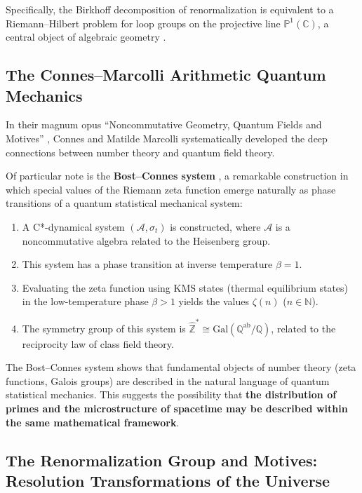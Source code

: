 \documentclass[12pt,a4paper]{article}
\theoremstyle{definition}
\begin{document}
Specifically, the Birkhoff decomposition of renormalization is equivalent to a Riemann--Hilbert problem for loop groups on the projective line $\mathbb{P}^1(\mathbb{C})$, a central object of algebraic geometry \cite{ConnesMarcolli2008}.

\subsection{The Connes--Marcolli Arithmetic Quantum Mechanics}

In their magnum opus ``Noncommutative Geometry, Quantum Fields and Motives'' \cite{ConnesMarcolli2008}, Connes and Matilde Marcolli systematically developed the deep connections between number theory and quantum field theory.

Of particular note is the \textbf{Bost--Connes system} \cite{BostConnes1995}, a remarkable construction in which special values of the Riemann zeta function emerge naturally as phase transitions of a quantum statistical mechanical system:

\begin{enumerate}[leftmargin=2em]
  \item A C*-dynamical system $(\mathcal{A}, \sigma_t)$ is constructed, where $\mathcal{A}$ is a noncommutative algebra related to the Heisenberg group.
  \item This system has a phase transition at inverse temperature $\beta = 1$.
  \item Evaluating the zeta function using KMS states (thermal equilibrium states) in the low-temperature phase $\beta > 1$ yields the values $\zeta(n)$ ($n \in \mathbb{N}$).
  \item The symmetry group of this system is $\hat{\mathbb{Z}}^* \cong \mathrm{Gal}(\mathbb{Q}^{\mathrm{ab}}/\mathbb{Q})$, related to the reciprocity law of class field theory.
\end{enumerate}

\begin{physbox}
The Bost--Connes system shows that fundamental objects of number theory (zeta functions, Galois groups) are described in the natural language of quantum statistical mechanics. This suggests the possibility that \textbf{the distribution of primes and the microstructure of spacetime may be described within the same mathematical framework}.
\end{physbox}

\subsection{The Renormalization Group and Motives: Resolution Transformations of the Universe}
\end{document}
